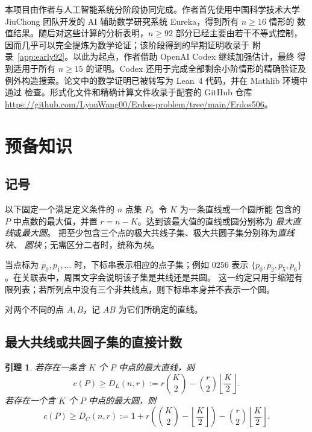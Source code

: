 \documentclass[11pt,a4paper]{ctexart}
\newtheorem{lemma}[theorem]{引理}
\theoremstyle{definition}
\begin{document}
本项目由作者与人工智能系统分阶段协同完成。作者首先使用中国科学技术大学
JiuChong 团队开发的 AI 辅助数学研究系统 Eureka，得到所有 $n\ge16$ 情形的
数值结果。随后对这些计算的分析表明，$n\ge92$ 部分已经主要由若干不等式控制，
因而几乎可以完全提炼为数学论证；该阶段得到的早期证明收录于
附录~\ref{app:early92}。以此为起点，作者借助 OpenAI Codex 继续加强估计，最终
得到适用于所有 $n\ge15$ 的证明。Codex 还用于完成全部剩余小阶情形的精确验证及
例外构造搜索。论文中的数学证明已被转写为 Lean~4 代码，并在 Mathlib 环境中通过
检查。形式化文件和精确计算文件收录于配套的 GitHub 仓库
\url{https://github.com/LyonWang00/Erdos-problem/tree/main/Erdos506}。

\section{预备知识}

\subsection{记号}

以下固定一个满足定义条件的 $n$ 点集 $P$。令 $K$ 为一条直线或一个圆所能
包含的 $P$ 中点数的最大值，并置 $r=n-K$。达到该最大值的直线或圆分别称为
\emph{最大直线}或\emph{最大圆}。
把至少包含三个点的极大共线子集、极大共圆子集分别称为\emph{直线块}、
\emph{圆块}；无需区分二者时，统称为\emph{块}。

当点标为 $p_0,p_1,\ldots$ 时，下标串表示相应的点子集；例如 $0256$ 表示
$\{p_0,p_2,p_5,p_6\}$。在关联表中，周围文字会说明该子集是共线还是共圆。
这一约定只用于缩短有限列表；若所列点中没有三个非共线点，则下标串本身并不表示一个圆。

对两个不同的点 $A,B$，记 $AB$ 为它们所确定的直线。

\subsection{最大共线或共圆子集的直接计数}

\begin{lemma}\label{lem:largest}
若存在一条含 $K$ 个 $P$ 中点的最大直线，则
\begin{equation}\label{eq:DL}
c(P)\ge D_L(n,r):=r\binom K2-\binom r2\left\lfloor\frac K2\right\rfloor.
\end{equation}
若存在一个含 $K$ 个 $P$ 中点的最大圆，则
\begin{equation}\label{eq:DC}
c(P)\ge D_C(n,r):=1+r\left(\binom K2-\left\lfloor\frac K2\right\rfloor\right)
-\binom r2\left\lfloor\frac K2\right\rfloor.
\end{equation}
\end{lemma}
\end{document}
